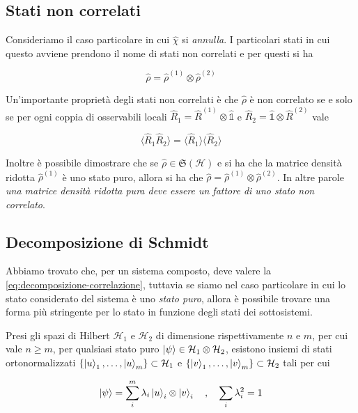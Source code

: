 \subsection{Stati non correlati}

Consideriamo il caso particolare in cui $\hat{\chi}$ si \emph{annulla}. I particolari stati in cui questo avviene prendono il nome di stati non correlati e per questi si ha 
%
\begin{tcolorbox}[colback=black!5!white, colframe=black!45!white, boxrule=0.8pt]
\begin{equation}
    \hat{\rho} = \hat{\rho}^{(1)} \otimes \hat{\rho}^{(2)}
\end{equation}
\end{tcolorbox}

Un'importante proprietà degli stati non correlati è che $\hat{\rho}$ è non correlato se e solo se per ogni coppia di osservabili locali $\hat{R}_1 = \hat{R}^{(1)} \otimes \hat{\mathds{1}}$ e $\hat{R}_2 = \hat{\mathds{1}} \otimes \hat{R}^{(2)}$ vale 
%
\begin{tcolorbox}[colback=black!5!white, colframe=black!45!white, boxrule=0.8pt]
\begin{equation}
    \langle \hat{R}_1 \hat{R}_2 \rangle = \langle \hat{R}_1 \rangle \langle \hat{R}_2 \rangle
\end{equation} 
\end{tcolorbox}

Inoltre è possibile dimostrare che se $\hat{\rho} \in \mathfrak{S}(\mathcal{H})$ e si ha che la matrice densità ridotta $\hat{\rho}^{(1)}$ è uno stato puro, allora si ha che $\hat{\rho} = \hat{\rho}^{(1)} \otimes \hat{\rho}^{(2)}$. In altre parole \emph{una matrice densità ridotta pura deve essere un fattore di uno stato non correlato}. 

\subsection{Decomposizione di Schmidt}

Abbiamo trovato che, per un sistema composto, deve valere la \eqref{eq:decomposizione-correlazione}, tuttavia se siamo nel caso particolare in cui lo stato considerato del sistema è uno \emph{stato puro}, allora è possibile trovare una forma più stringente per lo stato in funzione degli stati dei sottosistemi. 

Presi gli spazi di Hilbert $\mathcal{H}_1$ e $\mathcal{H}_2$ di dimensione rispettivamente $n$ e $m$, per cui vale $n \geq m$, per qualsiasi stato puro $\ket{\psi} \in \mathcal{H}_1 \otimes \mathcal{H}_2$, esistono insiemi di stati ortonormalizzati $\{\ket{u}_1, \dots , \ket{u}_m \} \subset \mathcal{H}_1$ e $\{\ket{v}_1, \dots , \ket{v}_m \} \subset \mathcal{H}_2$ tali per cui
%
\begin{tcolorbox}[colback=black!5!white, colframe=black!45!white, boxrule=0.8pt]
\begin{equation}
    \ket{\psi} = \sum_i^m \lambda_i \ket{u}_i \otimes \ket{v}_i \quad , \quad \sum_i \lambda_i^2 = 1
\end{equation} 
\end{tcolorbox}

